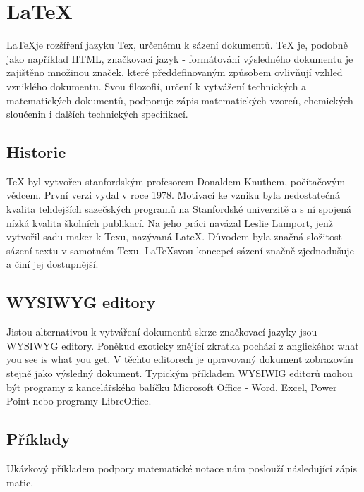 \documentclass[main.tex]{subfiles}
\begin{document}
\section{\LaTeX}
\LaTeX je rozšíření jazyku Tex, určenému k sázení dokumentů. TeX je, podobně jako například HTML, značkovací jazyk - formátování výsledného dokumentu je zajištěno množinou značek, které předdefinovaným způsobem ovlivňují vzhled vzniklého dokumentu. Svou filozofií, určení k vytvážení technických a matematických dokumentů, podporuje zápis matematických vzorců, chemických sloučenin i dalších technických specifikací. 

\subsection{Historie}
TeX byl vytvořen stanfordským profesorem Donaldem Knuthem, počítačovým vědcem. První verzi vydal v roce 1978. Motivací ke vzniku byla nedostatečná kvalita tehdejších sazečských programů na Stanfordské univerzitě a s ní spojená nízká kvalita školních publikací. Na jeho práci navázal Leslie Lamport, jenž vytvořil sadu maker k Texu, nazývaná LateX. Důvodem byla značná složitost sázení textu v samotném Texu. \LaTeX svou koncepcí sázení značně zjednodušuje a činí jej dostupnější. 


\subsection{WYSIWYG editory}
Jistou alternativou k vytváření dokumentů skrze značkovací jazyky jsou WYSIWYG editory. Poněkud exoticky znějící zkratka pochází z anglického: what you see is what you get. V těchto editorech je upravovaný dokument zobrazován stejně jako výsledný dokument. Typickým příkladem WYSIWIG editorů mohou být programy z kancelářského balíčku Microsoft Office - Word, Excel, Power Point nebo programy LibreOffice.



\subsection{Příklady}
Ukázkový příkladem podpory matematické notace nám poslouží následující zápis matic.
\end{document}
